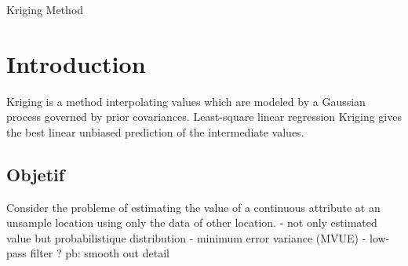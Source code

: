 \documentclass[twocolumn]{article}
\numberwithin{equation}{section}
\begin{document}
\begin{center}
     \Large{Kriging Method } \\
\end{center}

\section{Introduction}
Kriging is a method interpolating values which are modeled by a Gaussian process governed by prior covariances.
Least-square linear regression 
Kriging gives the best linear unbiased prediction of the intermediate values.

\subsection{Objetif}
Consider the probleme of estimating the value of a continuous attribute at an unsample location using only the data of other location.
- not only estimated value but probabilistique distribution
- minimum error variance (MVUE)
- low-pass filter ?
pb: smooth out detail
\end{document}
